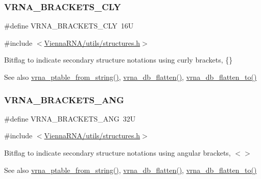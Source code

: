 \subsubsection{\texorpdfstring{VRNA\_BRACKETS\_CLY}{VRNA\_BRACKETS\_CLY}}
{\footnotesize\ttfamily \#define V\+R\+N\+A\+\_\+\+B\+R\+A\+C\+K\+E\+T\+S\+\_\+\+C\+LY~16U}



{\ttfamily \#include $<$\mbox{\hyperlink{utils_2structures_8h}{Vienna\+R\+N\+A/utils/structures.\+h}}$>$}



Bitflag to indicate secondary structure notations using curly brackets, {\ttfamily \{\}} 

\begin{DoxySeeAlso}{See also}
\mbox{\hyperlink{group__struct__utils__pair__table_gac76c9ef3de507748fb0416a59323362b}{vrna\+\_\+ptable\+\_\+from\+\_\+string()}}, \mbox{\hyperlink{group__struct__utils__dot__bracket_gafd1304f5a86e2e3f1425e725cde44fa2}{vrna\+\_\+db\+\_\+flatten()}}, \mbox{\hyperlink{group__struct__utils__dot__bracket_ga690425199c8b71545e7196e3af1436f8}{vrna\+\_\+db\+\_\+flatten\+\_\+to()}} 
\end{DoxySeeAlso}
\mbox{\label{group__struct__utils__dot__bracket_ga863e03f7f73f10fc9bbcbefbdda4bec8}} 
\subsubsection{\texorpdfstring{VRNA\_BRACKETS\_ANG}{VRNA\_BRACKETS\_ANG}}
{\footnotesize\ttfamily \#define V\+R\+N\+A\+\_\+\+B\+R\+A\+C\+K\+E\+T\+S\+\_\+\+A\+NG~32U}



{\ttfamily \#include $<$\mbox{\hyperlink{utils_2structures_8h}{Vienna\+R\+N\+A/utils/structures.\+h}}$>$}



Bitflag to indicate secondary structure notations using angular brackets, {\ttfamily $<$$>$} 

\begin{DoxySeeAlso}{See also}
\mbox{\hyperlink{group__struct__utils__pair__table_gac76c9ef3de507748fb0416a59323362b}{vrna\+\_\+ptable\+\_\+from\+\_\+string()}}, \mbox{\hyperlink{group__struct__utils__dot__bracket_gafd1304f5a86e2e3f1425e725cde44fa2}{vrna\+\_\+db\+\_\+flatten()}}, \mbox{\hyperlink{group__struct__utils__dot__bracket_ga690425199c8b71545e7196e3af1436f8}{vrna\+\_\+db\+\_\+flatten\+\_\+to()}} 
\end{DoxySeeAlso}
\mbox{\label{group__struct__utils__dot__bracket_ga60525d61d7496eeea490a37f3d6bf757}} 
